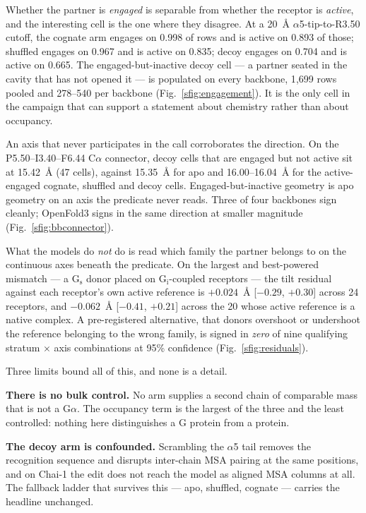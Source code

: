 Whether the partner is \emph{engaged} is separable from whether the receptor is
\emph{active}, and the interesting cell is the one where they disagree. At a
20~\AA{} $\alpha$5-tip-to-R3.50 cutoff, the cognate arm engages on 0.998 of rows
and is active on 0.893 of those; shuffled engages on 0.967 and is active on
0.835; decoy engages on 0.704 and is active on 0.665. The engaged-but-inactive
decoy cell --- a partner seated in the cavity that has not opened it --- is
populated on every backbone, 1{,}699 rows pooled and 278--540 per backbone
(Fig.~\ref{sfig:engagement}). It is the only cell in the campaign that can support
a statement about chemistry rather than about occupancy.

An axis that never participates in the call corroborates the direction. On the
P5.50--I3.40--F6.44 C$\alpha$ connector, decoy cells that are engaged but not
active sit at 15.42~\AA{} (47 cells), against 15.35~\AA{} for apo and 16.00--16.04~\AA{}
for the active-engaged cognate, shuffled and decoy cells. Engaged-but-inactive
geometry is apo geometry on an axis the predicate never reads. Three of four
backbones sign cleanly; OpenFold3 signs in the same direction at smaller
magnitude (Fig.~\ref{sfig:bbconnector}).

What the models do \emph{not} do is read which family the partner belongs to on
the continuous axes beneath the predicate. On the largest and best-powered
mismatch --- a G$_\mathrm{s}$ donor placed on G$_\mathrm{i}$-coupled receptors ---
the tilt residual against each receptor's own active reference is $+0.024$~\AA{}
[$-0.29$, $+0.30$] across 24 receptors, and $-0.062$~\AA{} [$-0.41$, $+0.21$]
across the 20 whose active reference is a native complex. A pre-registered
alternative, that donors overshoot or undershoot the reference belonging to the
wrong family, is signed in \emph{zero} of nine qualifying stratum $\times$ axis
combinations at 95\% confidence (Fig.~\ref{sfig:residuals}).

Three limits bound all of this, and none is a detail.

\textbf{There is no bulk control.} No arm supplies a second chain of comparable
mass that is not a G$\alpha$. The occupancy term is the largest of the three and
the least controlled: nothing here distinguishes a G protein from a protein.

\textbf{The decoy arm is confounded.} Scrambling the $\alpha$5 tail removes the
recognition sequence and disrupts inter-chain MSA pairing at the same positions,
and on Chai-1 the edit does not reach the model as aligned MSA columns at all.
The fallback ladder that survives this --- apo, shuffled, cognate --- carries the
headline unchanged.

